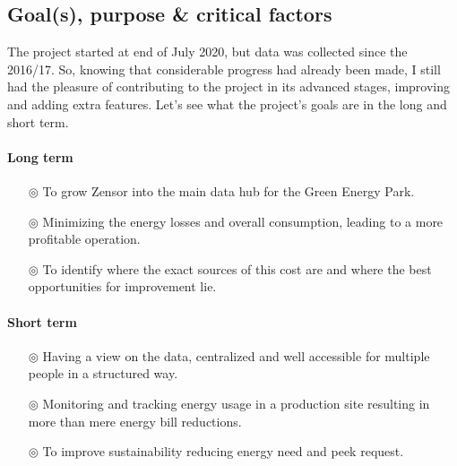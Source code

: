 \subsection{Goal(s), purpose \& critical factors}

The project started at end of July 2020, but data was collected since the 2016/17. 
So, knowing that considerable progress had already been made, I still had the pleasure of contributing to the project in its advanced stages, improving and adding extra features.
Let's see what the project's goals are in the long and short term.

\paragraph{Long term}
\begin{itemize}
    \item[$\circledcirc$] To grow Zensor into the main data hub for the Green Energy Park.
    \item[$\circledcirc$] Minimizing the energy losses and overall consumption, leading to a more profitable operation.
    \item[$\circledcirc$] To identify where the exact sources of this cost are and where the best opportunities for improvement lie.
\end{itemize}

\paragraph{Short term}
\begin{itemize}
    \item[$\circledcirc$] Having a view on the data, centralized and well accessible for multiple people in a structured way.
    \item[$\circledcirc$] Monitoring and tracking energy usage in a production site resulting in more than mere energy bill reductions.
    \item[$\circledcirc$] To improve sustainability reducing energy need and peek request. 
\end{itemize}

